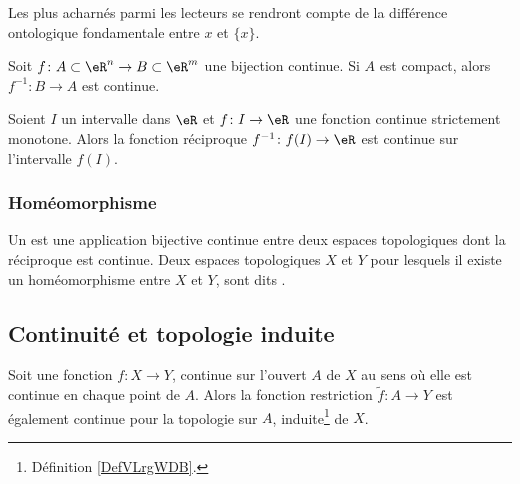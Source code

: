 Les plus acharnés parmi les lecteurs se rendront compte de la différence ontologique fondamentale entre \( x\) et \( \{ x \}\).

\begin{proposition}	\label{PropoInvCompCont}
Soit $f\colon A\subset\eR^n\to B\subset\eR^m$ une bijection continue. Si $A$ est compact, alors $f^{-1}\colon B\to A$ est continue.
\end{proposition}

\begin{proposition}		\label{PropIntContMOnIvCont}
Soient $I$ un intervalle dans $\eR$ et $f\colon I\to \eR$ une fonction continue strictement monotone. Alors la fonction réciproque $f^{-1}\colon f(I)\to \eR$ est continue sur l'intervalle $f(I)$.
\end{proposition}

\subsubsection{Homéomorphisme}

\begin{definition}[homéomorphisme]      \label{DEFooYPGQooMAObTO}
    Un  est une application bijective continue entre deux espaces topologiques dont la réciproque est continue. Deux espaces topologiques $X$ et $Y$ pour lesquels il existe un homéomorphisme entre $X$ et $Y$, sont dits .
\end{definition}

\subsection{Continuité et topologie induite}
\begin{proposition}     \label{PROPooNPLBooPfmmym}
    Soit une fonction \( f\colon X\to Y\), continue sur l'ouvert \( A\) de \( X\) au sens où elle est continue en chaque point de \( A\). Alors la fonction restriction \( \tilde f\colon A\to Y\) est également continue pour la topologie sur \( A\), induite\footnote{Définition \ref{DefVLrgWDB}.} de \( X\).
\end{proposition}

